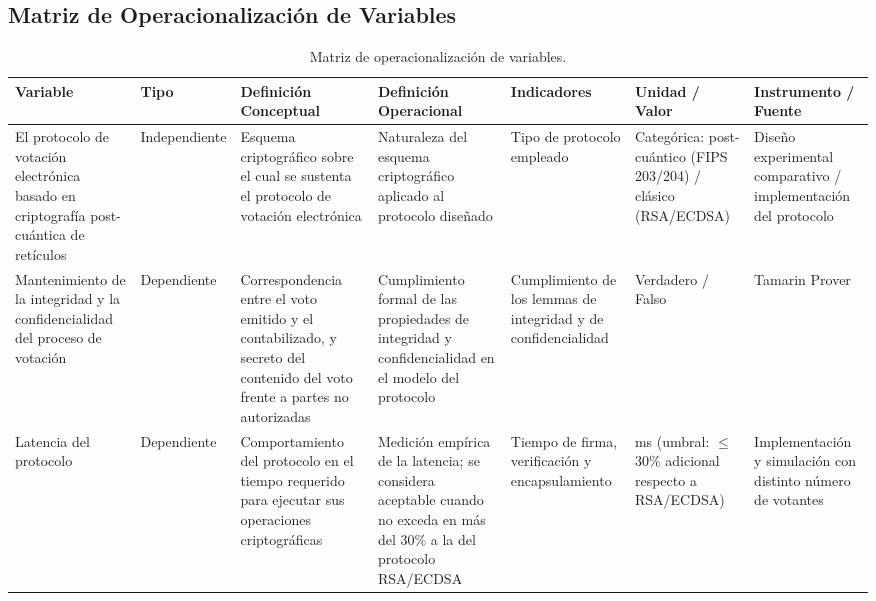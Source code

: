 \subsection{Matriz de Operacionalización de Variables}
\begin{table}[!htbp]
\centering
\renewcommand{\arraystretch}{1.3}
\scriptsize
\setlength{\tabcolsep}{3pt}
\begin{tabular}{|>{\raggedright\arraybackslash}p{2.0cm}|>{\raggedright\arraybackslash}p{1.6cm}|>{\raggedright\arraybackslash}p{2.2cm}|>{\raggedright\arraybackslash}p{2.4cm}|>{\raggedright\arraybackslash}p{1.8cm}|>{\raggedright\arraybackslash}p{1.9cm}|>{\raggedright\arraybackslash}p{1.9cm}|}
	\hline
	\textbf{Variable} &
	\textbf{Tipo} &
	\textbf{Definición Conceptual} &
	\textbf{Definición Operacional} &
	\textbf{Indicadores} &
	\textbf{Unidad / Valor} &
	\textbf{Instrumento / Fuente} \\
	\hline
	El protocolo de votación electrónica basado en criptografía post-cuántica de retículos &
	Independiente &
	Esquema criptográfico sobre el cual se sustenta el protocolo de votación electrónica &
	Naturaleza del esquema criptográfico aplicado al protocolo diseñado &
	Tipo de protocolo empleado &
	Categórica: post-cuántico (FIPS 203/204) / clásico (RSA/ECDSA) &
	Diseño experimental comparativo / implementación del protocolo \\
	\hline
	Mantenimiento de la integridad y la confidencialidad del proceso de votación &
	Dependiente &
	Correspondencia entre el voto emitido y el contabilizado, y secreto del contenido del voto frente a partes no autorizadas &
	Cumplimiento formal de las propiedades de integridad y confidencialidad en el modelo del protocolo &
	Cumplimiento de los lemmas de integridad y de confidencialidad &
	Verdadero / Falso &
	Tamarin Prover \\
	\hline
	Latencia del protocolo &
	Dependiente &
	Comportamiento del protocolo en el tiempo requerido para ejecutar sus operaciones criptográficas &
	Medición empírica de la latencia; se considera aceptable cuando no exceda en más del 30\% a la del protocolo RSA/ECDSA &
	Tiempo de firma, verificación y encapsulamiento &
	ms (umbral: $\le$ 30\% adicional respecto a RSA/ECDSA) &
	Implementación y simulación con distinto número de votantes \\
	\hline
\end{tabular}
\caption{Matriz de operacionalización de variables.}
\label{tab:operacionalizacion_tesis}
\par{}
\end{table}

